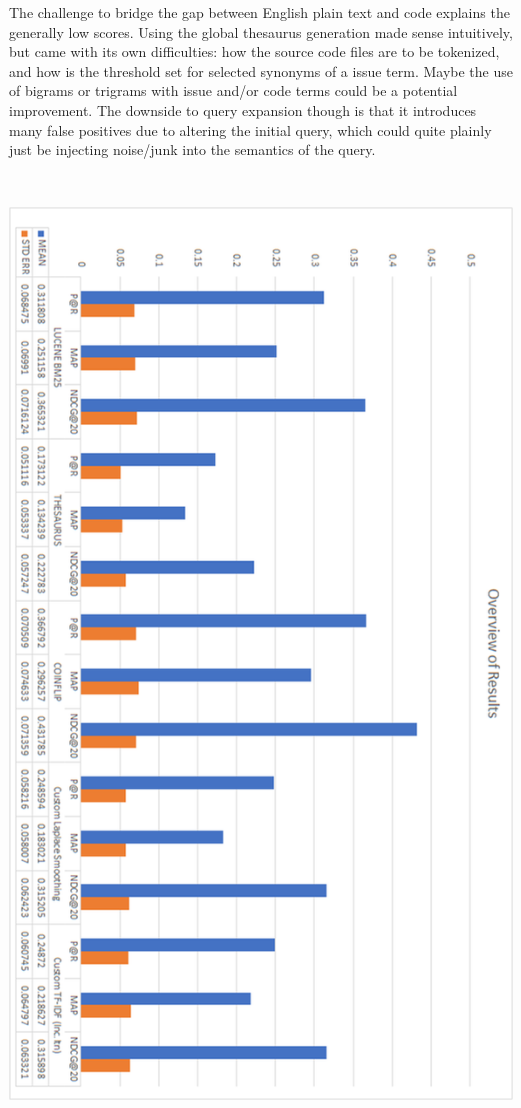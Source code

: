 \documentclass[10pt,a4paper]{article}
\begin{document}
The challenge to bridge the gap between English plain text and code explains the generally low scores. Using the global thesaurus generation made sense intuitively, but came with its own difficulties: how the source code files are to be tokenized, and how is the threshold set for selected synonyms of a issue term. Maybe the use of bigrams or trigrams with issue and/or code terms could be a potential improvement. The downside to query expansion though is that it introduces many false positives due to altering the initial query, which could quite plainly just be injecting noise/junk into the semantics of the query.

\includegraphics[height=10in]{graph.png}
\end{document}
